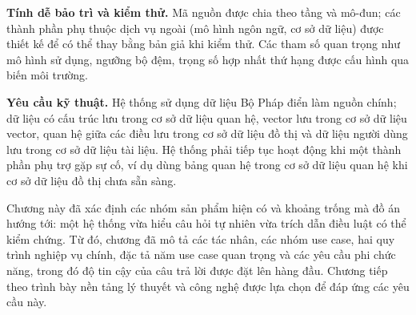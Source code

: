 \documentclass[../DoAn.tex]{subfiles}
\begin{document}
\textbf{Tính dễ bảo trì và kiểm thử.} Mã nguồn được chia theo tầng và mô-đun; các thành phần phụ thuộc dịch vụ ngoài (mô hình ngôn ngữ, cơ sở dữ liệu) được thiết kế để có thể thay bằng bản giả khi kiểm thử. Các tham số quan trọng như mô hình sử dụng, ngưỡng bộ đệm, trọng số hợp nhất thứ hạng được cấu hình qua biến môi trường.

\textbf{Yêu cầu kỹ thuật.} Hệ thống sử dụng dữ liệu Bộ Pháp điển làm nguồn chính; dữ liệu có cấu trúc lưu trong cơ sở dữ liệu quan hệ, vector lưu trong cơ sở dữ liệu vector, quan hệ giữa các điều lưu trong cơ sở dữ liệu đồ thị và dữ liệu người dùng lưu trong cơ sở dữ liệu tài liệu. Hệ thống phải tiếp tục hoạt động khi một thành phần phụ trợ gặp sự cố, ví dụ dùng bảng quan hệ trong cơ sở dữ liệu quan hệ khi cơ sở dữ liệu đồ thị chưa sẵn sàng.

Chương này đã xác định các nhóm sản phẩm hiện có và khoảng trống mà đồ án hướng tới: một hệ thống vừa hiểu câu hỏi tự nhiên vừa trích dẫn điều luật có thể kiểm chứng. Từ đó, chương đã mô tả các tác nhân, các nhóm use case, hai quy trình nghiệp vụ chính, đặc tả năm use case quan trọng và các yêu cầu phi chức năng, trong đó độ tin cậy của câu trả lời được đặt lên hàng đầu. Chương tiếp theo trình bày nền tảng lý thuyết và công nghệ được lựa chọn để đáp ứng các yêu cầu này.
\end{document}
